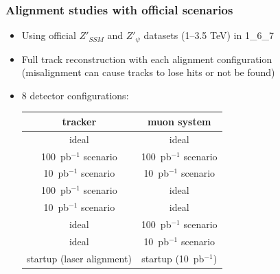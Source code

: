 \documentclass[compress]{beamer}
\begin{document}
\begin{frame}
\frametitle{Alignment studies with official scenarios}
\begin{itemize}\setlength{\itemsep}{0.25 cm}
\item Using official $Z'_{SSM}$ and $Z'_\psi$ datasets (1--3.5 TeV) in 1\_6\_7
\item Full track reconstruction with each alignment configuration \\
(misalignment can cause tracks to lose hits or not be found)
\item 8 detector configurations:
\begin{center}
\begin{tabular}{c c}
tracker & muon system \\\hline
ideal & ideal \\
100~pb$^{-1}$ scenario & 100~pb$^{-1}$ scenario \\
10~pb$^{-1}$ scenario & 10~pb$^{-1}$ scenario \\
100~pb$^{-1}$ scenario & ideal \\
10~pb$^{-1}$ scenario & ideal \\
ideal & 100~pb$^{-1}$ scenario \\
ideal & 10~pb$^{-1}$ scenario \\
startup (laser alignment) & startup (10~pb$^{-1}$) \\
\end{tabular}
\end{center}
\end{itemize}
\end{frame}
\end{document}
